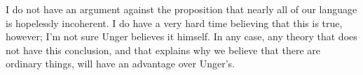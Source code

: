 \documentclass[11pt]{article}
\begin{document}
\begin{spacing}{1.5}
I do not have an argument against the proposition that nearly all of
our language is hopelessly incoherent.  I do have a very hard time
believing that this is true, however; I'm not sure Unger believes it
himself.  In any case, any theory that does not have this conclusion,
and that explains why we believe that there are ordinary things, will
have an advantage over Unger's.

\ifstandalone


\end{spacing}
\fi
\end{document}
